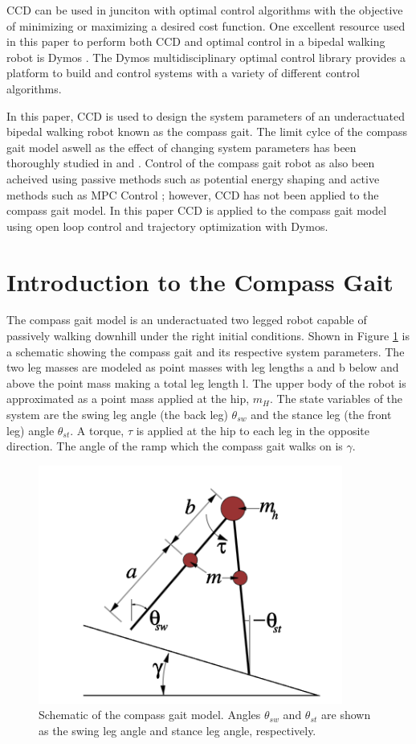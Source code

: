 \documentclass[smallextended]{./springer/svjour3}
\begin{document}
CCD can be used in junciton with optimal control algorithms with the objective of minimizing or maximizing a desired cost function. One 
excellent resource used in this paper to perform both CCD and optimal control in a bipedal walking robot is Dymos \cite{Falck2021}. The Dymos multidisciplinary optimal control library
provides a platform to build and control systems with a variety of different control algorithms.

%
In this paper, CCD is used to design the system parameters of an underactuated bipedal walking robot known as the compass gait. The limit cylce
of the compass gait model aswell as the effect of changing system parameters has been thoroughly studied 
in \cite{Goswami} and \cite{goswami:inria-00073701}. Control of the compass gait robot as also been acheived using passive methods such as potential energy shaping
\cite{Spong} and active methods such as MPC Control \cite{Kamath2009}; however, CCD has not been applied to the compass gait model.
In this paper CCD is applied to the compass gait model using open loop control and trajectory optimization with Dymos.

\section{Introduction to the Compass Gait}
The compass gait model is an underactuated two legged robot capable of passively walking downhill under the right initial conditions.
Shown in Figure \ref{fig:compassgaitmodel} is a schematic showing the compass gait and its respective system parameters. The two leg masses are modeled as
point masses with leg lengths a and b below and above the point mass making a total leg length l. The upper body of the robot is approximated as a point mass
applied at the hip, $m_H$. The state variables of the system are the swing leg angle (the back leg) $\theta_{sw}$ and the stance leg (the front leg) angle
$\theta_{st}$. A torque, $\tau$ is applied at the hip to each leg in the opposite direction. The angle of the ramp which the compass gait walks on is $\gamma$.

\begin{figure}[!h]
\centering
\includegraphics[width=10cm]{./figures/compassgaitmodel.png}
\caption{Schematic of the compass gait model. Angles $\theta_{sw}$ and $\theta_{st}$ are shown as the swing leg angle and stance leg angle, respectively.}
\label{fig:compassgaitmodel}
\end{figure}
\end{document}
